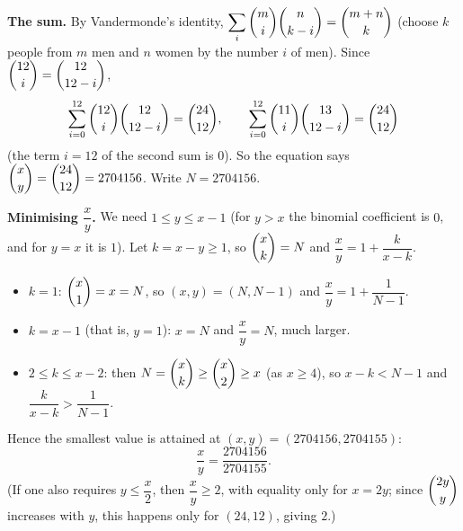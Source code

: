 \textbf{The sum.} By Vandermonde's identity, $\displaystyle\sum_i\dbinom{m}{i}\dbinom{n}{k-i}=\dbinom{m+n}{k}$ (choose $k$ people from $m$ men and $n$ women by the number $i$ of men). Since $\dbinom{12}{i}=\dbinom{12}{12-i}$,
\[
\sum_{i=0}^{12}\dbinom{12}{i}\dbinom{12}{12-i}=\dbinom{24}{12},\qquad \sum_{i=0}^{12}\dbinom{11}{i}\dbinom{13}{12-i}=\dbinom{24}{12}
\]
(the term $i=12$ of the second sum is $0$). So the equation says $\dbinom xy=\dbinom{24}{12}=2704156$. Write $N=2704156$.

\textbf{Minimising $\dfrac {x}{y}$.} We need $1\le y\le x-1$ (for $y>x$ the binomial coefficient is $0$, and for $y=x$ it is $1$). Let $k=x-y\ge1$, so $\dbinom xk=N$ and $\dfrac {x}{y}=1+\dfrac{k}{x-k}$.
\begin{itemize}
\item $k=1$: $\dbinom x1=x=N$, so $(x,y)=(N,N-1)$ and $\dfrac {x}{y}=1+\dfrac{1}{N-1}$.
\item $k=x-1$ (that is, $y=1$): $x=N$ and $\dfrac {x}{y}=N$, much larger.
\item $2\le k\le x-2$: then $N=\dbinom xk\ge\dbinom x2\ge x$ (as $x\ge4$), so $x-k<N-1$ and $\dfrac{k}{x-k}>\dfrac{1}{N-1}$.
\end{itemize}
Hence the smallest value is attained at $(x,y)=(2704156,2704155)$:
\[
\dfrac {x}{y}=\boxed{\dfrac{2704156}{2704155}}.
\]
(If one also requires $y\le\dfrac {x}{2}$, then $\dfrac {x}{y}\ge2$, with equality only for $x=2y$; since $\dbinom{2y}{y}$ increases with $y$, this happens only for $(24,12)$, giving $2$.)
